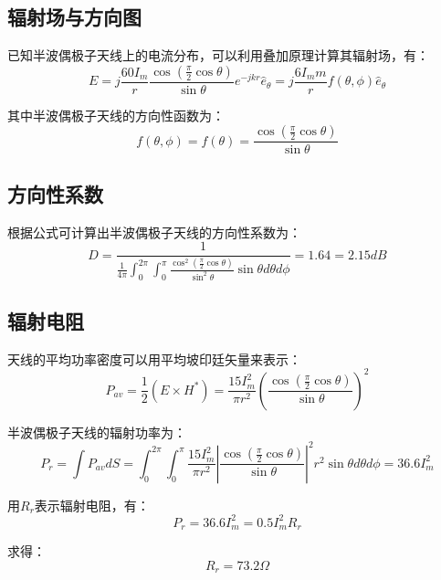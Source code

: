 \documentclass[12pt,a4paper,UTF8]{article}
\begin{document}
\subsection{\heiti\bfseries 辐射场与方向图}
已知半波偶极子天线上的电流分布，可以利用叠加原理计算其辐射场，有：
\begin{equation}
E = j\frac{60I_m}{r} \frac{\cos\left(\frac{\pi}{2}\cos\theta\right)}{\sin\theta} e^{-jkr}\hat{e}_\theta = j\frac{6I_m m}{r} f(\theta,\phi)\hat{e}_\theta
\end{equation}

其中半波偶极子天线的方向性函数为：
\begin{equation}
f(\theta,\phi) = f(\theta) = \frac{\cos\left(\frac{\pi}{2}\cos\theta\right)}{\sin\theta}
\end{equation}

\subsection{\heiti\bfseries 方向性系数}
根据公式可计算出半波偶极子天线的方向性系数为：
\begin{equation}
D = \frac{1}{\frac{1}{4\pi}\int_0^{2\pi}\int_0^{\pi}\frac{\cos^2\left(\frac{\pi}{2}\cos\theta\right)}{\sin^2\theta}\sin\theta d\theta d\phi} = 1.64 = 2.15dB
\end{equation}

\subsection{\heiti\bfseries 辐射电阻}
天线的平均功率密度可以用平均坡印廷矢量来表示：
\begin{equation}
P_{av} = \frac{1}{2}(E \times H^*) = \frac{15I_m^2}{\pi r^2} \left(\frac{\cos\left(\frac{\pi}{2}\cos\theta\right)}{\sin\theta}\right)^2
\end{equation}

半波偶极子天线的辐射功率为：
\begin{equation}
P_r = \int P_{av}dS = \int_0^{2\pi} \int_0^{\pi} \frac{15I_m^2}{\pi r^2} \left|\frac{\cos\left(\frac{\pi}{2}\cos\theta\right)}{\sin\theta}\right|^2 r^2 \sin\theta d\theta d\phi = 36.6I_m^2
\end{equation}

用$R_r$表示辐射电阻，有：
\begin{equation}
P_r = 36.6I_m^2 = 0.5I_m^2 R_r
\end{equation}

求得：
\begin{equation}
R_r = 73.2\Omega
\end{equation}
\end{document}
